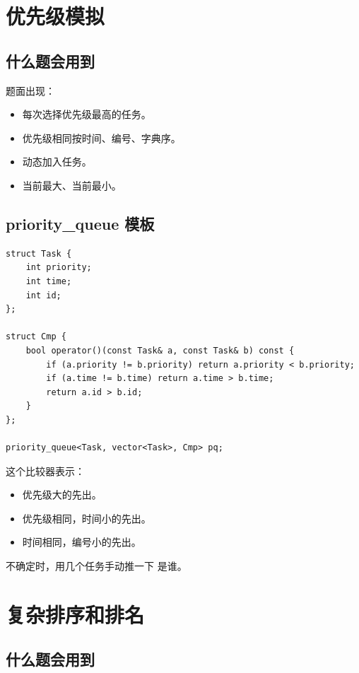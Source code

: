 \section{优先级模拟}\label{sec:07-15}

\subsection{什么题会用到}

题面出现：

\begin{itemize}
  \item 每次选择优先级最高的任务。
  \item 优先级相同按时间、编号、字典序。
  \item 动态加入任务。
  \item 当前最大、当前最小。
\end{itemize}

\subsection{priority\_queue 模板}

\begin{lstlisting}
struct Task {
    int priority;
    int time;
    int id;
};

struct Cmp {
    bool operator()(const Task& a, const Task& b) const {
        if (a.priority != b.priority) return a.priority < b.priority;
        if (a.time != b.time) return a.time > b.time;
        return a.id > b.id;
    }
};

priority_queue<Task, vector<Task>, Cmp> pq;
\end{lstlisting}

这个比较器表示：

\begin{itemize}
  \item 优先级大的先出。
  \item 优先级相同，时间小的先出。
  \item 时间相同，编号小的先出。
\end{itemize}

不确定时，用几个任务手动推一下  是谁。

\section{复杂排序和排名}\label{sec:07-16}

\subsection{什么题会用到}

